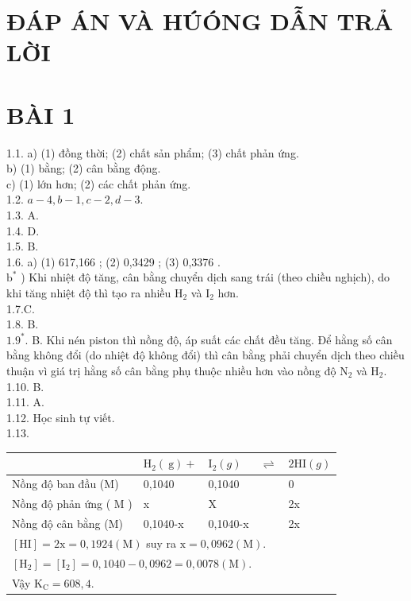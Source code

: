 \documentclass[10pt]{article}
\begin{document}
\section*{ĐÁP ÁN VÀ HÚÓNG DẪN TRẢ LỜI}
\section*{BÀI 1}
1.1. a) (1) đồng thời; (2) chất sản phẩm; (3) chất phản ứng.\\
b) (1) bằng; (2) cân bằng động.\\
c) (1) lớn hơn; (2) các chất phản ứng.\\
1.2. $a-4, b-1, c-2, d-3$.\\
1.3. A.\\
1.4. D.\\
1.5. B.\\
1.6. a) (1) 617,166 ; (2) 0,3429 ; (3) 0,3376 .\\
$\mathrm{b}^{*}$ ) Khi nhiệt độ tăng, cân bằng chuyển dịch sang trái (theo chiều nghịch), do khi tăng nhiệt độ thì tạo ra nhiều $\mathrm{H}_{2}$ và $\mathrm{I}_{2}$ hơn.\\
1.7.C.\\
1.8. B.\\
$1.9^{*}$. B. Khi nén piston thì nồng độ, áp suất các chất đều tăng. Để hằng số cân bằng không đổi (do nhiệt độ không đổi) thì cân bằng phải chuyển dịch theo chiều thuận vì giá trị hằng số cân bằng phụ thuộc nhiều hơn vào nồng độ $\mathrm{N}_{2}$ và $\mathrm{H}_{2}$.\\
1.10. B.\\
1.11. A.\\
1.12. Học sinh tự viết.\\
1.13.

\begin{center}
\begin{tabular}{|l|l|l|l|l|}
\hline
 & $\mathrm{H}_{2}(\mathrm{~g})+$ & $\mathrm{I}_{2}(g)$ & $\rightleftharpoons$ & $2 \mathrm{HI}(g)$ \\
\hline
Nồng độ ban đầu (M) & 0,1040 & 0,1040 &  & 0 \\
\hline
Nồng độ phản ứng ( M ) & x & X &  & 2x \\
\hline
Nồng độ cân bằng (M) & 0,1040-x & 0,1040-x &  & 2x \\
\hline
\multicolumn{5}{|l|}{$[\mathrm{HI}]=2 \mathrm{x}=0,1924(\mathrm{M})$ suy ra $\mathrm{x}=0,0962(\mathrm{M})$.} \\
\hline
\multicolumn{5}{|l|}{$\left[\mathrm{H}_{2}\right]=\left[\mathrm{I}_{2}\right]=0,1040-0,0962=0,0078(\mathrm{M})$.} \\
\hline
\multicolumn{5}{|l|}{Vậy $\mathrm{K}_{\mathrm{C}}=608,4$.} \\
\hline
\end{tabular}
\end{center}
\end{document}
